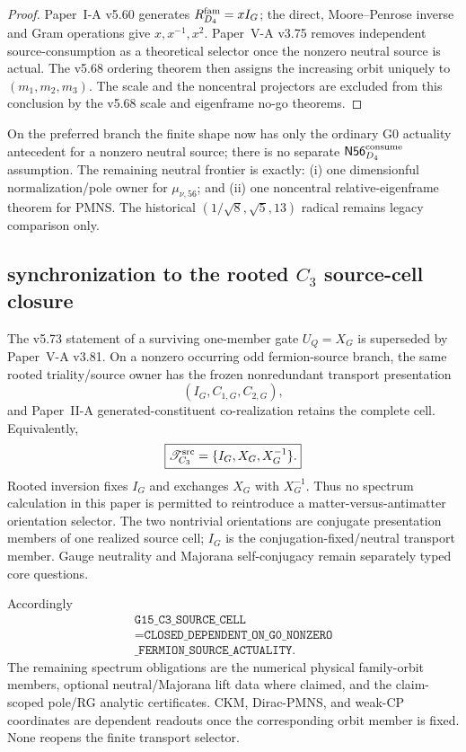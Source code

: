 \documentclass[12pt,a4paper]{article}
\begin{document}
\begin{proof}
Paper~I-A v5.60 generates \(R_{D_4}^{\rm fam}=xI_G\); the direct,
Moore--Penrose inverse and Gram operations give \(x,x^{-1},x^2\).  Paper~V-A
v3.75 removes independent source-consumption as a theoretical selector once
the nonzero neutral source is actual.  The v5.68 ordering theorem then assigns
the increasing orbit uniquely to \((m_1,m_2,m_3)\).  The scale and the
noncentral projectors are excluded from this conclusion by the v5.68 scale and
eigenframe no-go theorems.
\end{proof}

\begin{remark}
\label{p6:rem:v569-updated-neutral-frontier}
On the preferred branch the finite shape now has only the ordinary G0
actuality antecedent for a nonzero neutral source; there is no separate
\(\mathsf{N56}_{D_4}^{\rm consume}\) assumption.  The remaining neutral
frontier is exactly:
(i) one dimensionful normalization/pole owner for \(\mu_{\nu,56}\); and
(ii) one noncentral relative-eigenframe theorem for PMNS.  The historical
\((1/\sqrt8,\sqrt5,13)\) radical remains legacy comparison only.
\end{remark}


\subsection{synchronization to the rooted \texorpdfstring{$C_3$}{C3} source-cell closure}
\label{p6:sec:v575-g15-c3-sync}
The v5.73 statement of a surviving one-member gate
\(U_Q=X_G\) is superseded by Paper~V-A v3.81.  On a nonzero occurring odd
fermion-source branch, the same rooted triality/source owner has the frozen
nonredundant transport presentation
\[
 (I_G,C_{1,G},C_{2,G}),
\]
and Paper~II-A generated-constituent co-realization retains the complete cell.
Equivalently,
\[
 \boxed{\mathscr T_{C_3}^{\rm src}=\{I_G,X_G,X_G^{-1}\}.}
\]
Rooted inversion fixes \(I_G\) and exchanges \(X_G\) with \(X_G^{-1}\).
Thus no spectrum calculation in this paper is permitted to reintroduce a
matter-versus-antimatter orientation selector.  The two nontrivial
orientations are conjugate presentation members of one realized source cell;
\(I_G\) is the conjugation-fixed/neutral transport member.  Gauge neutrality
and Majorana self-conjugacy remain separately typed core questions.

Accordingly
\[
 \boxed{\begin{gathered}
 \texttt{G15\_C3\_SOURCE\_CELL}\\
 =\texttt{CLOSED\_DEPENDENT\_ON\_G0\_NONZERO}\\
 \texttt{\_FERMION\_SOURCE\_ACTUALITY}.
 \end{gathered}}
\]
The remaining spectrum obligations are the numerical physical family-orbit
members, optional neutral/Majorana lift data where claimed, and the
claim-scoped pole/RG analytic certificates.  CKM, Dirac-PMNS, and weak-CP
coordinates are dependent readouts once the corresponding orbit member is
fixed.  None reopens the finite transport
selector.
\end{document}
